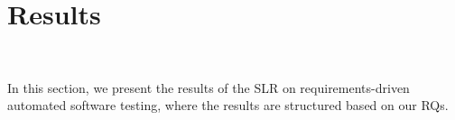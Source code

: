 \section{Results}~\label{sec:Results}

In this section, we present the results of the SLR on requirements-driven automated software testing, where the results are structured based on our RQs.







